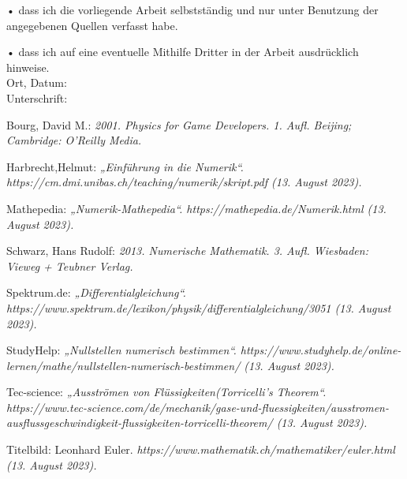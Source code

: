 \documentclass[a4paper,12pt]{report}
\begin{document}
\noindent 
•	dass ich die vorliegende Arbeit selbstständig und nur unter Benutzung der angegebenen Quellen verfasst habe. 

\noindent
•	dass ich auf eine eventuelle Mithilfe Dritter in der Arbeit ausdrücklich hinweise. \\

\noindent
Ort, Datum: \\

\noindent
Unterschrift:

\begin{thebibliography}{99}

 Bourg, David M.:
\emph{2001. Physics for Game Developers. 1. Aufl. Beijing; Cambridge: O'Reilly Media.}

 Harbrecht,Helmut:
\emph{„Einführung in die Numerik“. https://cm.dmi.unibas.ch/teaching/numerik/skript.pdf (13. August 2023).}

 Mathepedia:
\emph{„Numerik-Mathepedia“. https://mathepedia.de/Numerik.html (13. August 2023).}

 Schwarz, Hans Rudolf:
\emph{2013. Numerische Mathematik. 3. Aufl. Wiesbaden: Vieweg + Teubner Verlag.}

 Spektrum.de:
\emph{„Differentialgleichung“. https://www.spektrum.de/lexikon/physik/differentialgleichung/3051 (13. August 2023).}

 StudyHelp:
\emph{„Nullstellen numerisch bestimmen“. https://www.studyhelp.de/online-lernen/mathe/nullstellen-numerisch-bestimmen/ (13. August 2023).}

 Tec-science:
\emph{„Ausströmen von Flüssigkeiten(Torricelli's Theorem“. https://www.tec-science.com/de/mechanik/gase-und-fluessigkeiten/ausstromen-ausflussgeschwindigkeit-flussigkeiten-torricelli-theorem/ (13. August 2023).}

 Titelbild: Leonhard Euler.
\emph{https://www.mathematik.ch/mathematiker/euler.html (13. August 2023).}

\end{thebibliography}
\end{document}
